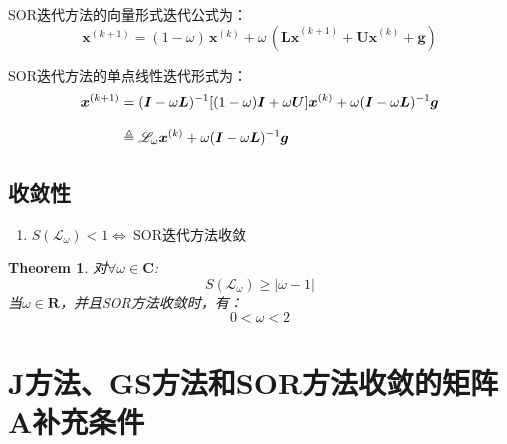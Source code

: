 SOR迭代方法的向量形式迭代公式为：
\[
    \boldsymbol{x}^{(k+1)} = (1-\omega)\,\boldsymbol{x}^{(k)} + \omega\,(\boldsymbol{Lx}^{(k+1)}+\boldsymbol{Ux}^{(k)}+\boldsymbol{g}) 
\]

SOR迭代方法的单点线性迭代形式为：
\begin{align}
    \boldsymbol{x}^{(k+1)} &= (\boldsymbol{I}-\omega\boldsymbol{L})^{-1} [(1-\omega)\boldsymbol{I}+\omega\boldsymbol{U}]\boldsymbol{x}^{(k)} + \omega(\boldsymbol{I}-\omega\boldsymbol{L})^{-1}\boldsymbol{g} \notag \\[3mm]
    &\triangleq \mathscr{L}_\omega \boldsymbol{x}^{(k)} + \omega(\boldsymbol{I}-\omega\boldsymbol{L})^{-1}\boldsymbol{g}
\end{align}


\subsection{收敛性}
\begin{enumerate}
    \item $ S(\mathscr{L}_\omega) < 1 \Leftrightarrow \ $SOR迭代方法收敛
\end{enumerate}

\newpage
\newtheorem{th5}{Theorem}[section]
\begin{th5}
    对$\forall \omega \in \mathbf{C}$:
    \[S(\mathscr{L}_\omega) \geqslant \vert\omega-1\vert\]
    当$\omega \in \mathbf{R}$，并且SOR方法收敛时，有：
    \[0<\omega<2\]
\end{th5}


\section*{J方法、GS方法和SOR方法收敛的矩阵A补充条件}

